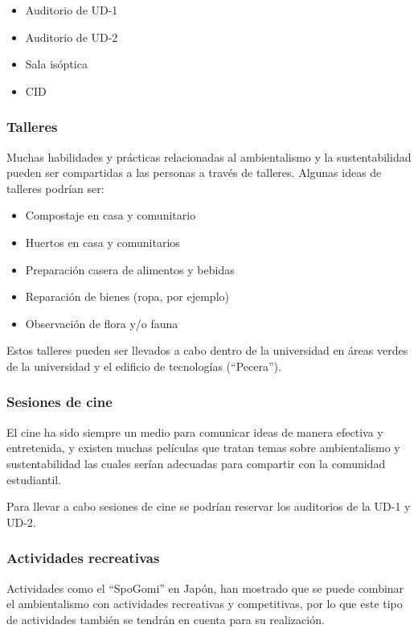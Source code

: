 \begin{itemize}
    \item Auditorio de UD-1
    \item Auditorio de UD-2
    \item Sala isóptica
    \item CID
\end{itemize}

\subsubsection{Talleres}

Muchas habilidades y prácticas relacionadas al ambientalismo y la sustentabilidad pueden ser compartidas a las personas a través de talleres. Algunas ideas de talleres podrían ser:

\begin{itemize}
    \item Compostaje en casa y comunitario
    \item Huertos en casa y comunitarios
    \item Preparación casera de alimentos y bebidas
    \item Reparación de bienes (ropa, por ejemplo)
    \item Observación de flora y/o fauna
\end{itemize}

Estos talleres pueden ser llevados a cabo dentro de la universidad en áreas verdes de la universidad y el edificio de tecnologías (“Pecera”).

\subsubsection{Sesiones de cine}

El cine ha sido siempre un medio para comunicar ideas de manera efectiva y entretenida, y existen muchas películas que tratan temas sobre ambientalismo y sustentabilidad las cuales serían adecuadas para compartir con la comunidad estudiantil.

Para llevar a cabo sesiones de cine se podrían reservar los auditorios de la UD-1 y UD-2.

\subsubsection{Actividades recreativas}

Actividades como el ``SpoGomi'' en Japón, han mostrado que se puede combinar el ambientalismo con actividades recreativas y competitivas, por lo que este tipo de actividades también se tendrán en cuenta para su realización.
